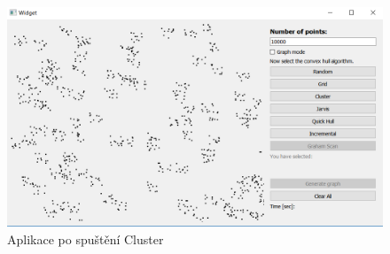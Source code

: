 \documentclass{article}
\begin{document}
\begin{figure}[htbp]
\centering
        \includegraphics[clip, trim=0cm 0cm 0cm 0cm, width=1\textwidth]{obrazek4.png}
        \caption{Aplikace po spuštění Cluster}
\end{figure}
\clearpage
\newpage
\end{document}
